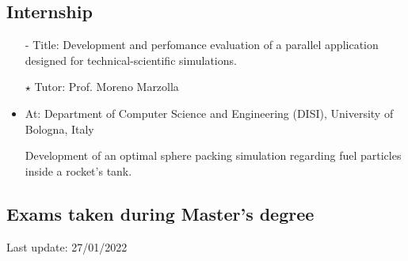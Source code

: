 \documentclass[curriculum-vitae-eng]{subfiles}
\begin{document}
		\subsection*{Internship}
			\begin{itemize}
				\item[-] {\large Title:} Development and perfomance evaluation of a parallel application designed for technical-scientific simulations.
				\item[$\star$] {\large Tutor:} Prof. Moreno Marzolla
				\item {\large At:} Department of Computer Science and Engineering (DISI), University of Bologna, Italy
				\item[] Development of an optimal sphere packing simulation regarding fuel particles inside a rocket's tank.
			\end{itemize}
		
		\subsection*{Exams taken during Master's degree}
			{\small Last update: 27/01/2022}
			\medskip
			
			\begin{minipage}[t]{.47\textwidth}
			\end{minipage}
			\hfill
			\begin{minipage}[t]{.47\textwidth}
			\end{minipage}
\end{document}

